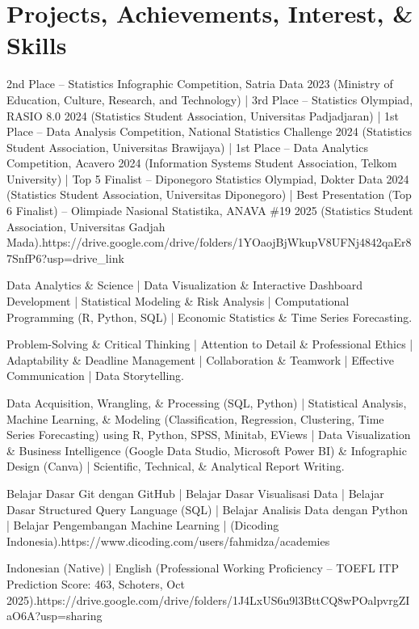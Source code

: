 \documentclass[a4paper,10pt]{article}
\begin{document}
\section{Projects, Achievements, Interest, \& Skills}


 {2nd Place – Statistics Infographic Competition, Satria Data 2023 (Ministry of Education, Culture, Research, and Technology) | 3rd Place – Statistics Olympiad, RASIO 8.0 2024 (Statistics Student Association, Universitas Padjadjaran) | 1st Place – Data Analysis Competition, National Statistics Challenge 2024 (Statistics Student Association, Universitas Brawijaya) | 1st Place – Data Analytics Competition, Acavero 2024 (Information Systems Student Association, Telkom University) | Top 5 Finalist – Diponegoro Statistics Olympiad, Dokter Data 2024 (Statistics Student Association, Universitas Diponegoro) | Best Presentation (Top 6 Finalist) – Olimpiade Nasional Statistika, ANAVA \#19 2025 (Statistics Student Association, Universitas Gadjah Mada).}{https://drive.google.com/drive/folders/1YOaojBjWkupV8UFNj4842qaEr87SnfP6?usp=drive_link}

 {Data Analytics \& Science | Data
  Visualization \& Interactive Dashboard Development | Statistical Modeling \& Risk Analysis | Computational Programming (R, Python, SQL) | Economic Statistics \& Time Series Forecasting.}

 {Problem-Solving \& Critical Thinking | Attention to Detail \& Professional Ethics | Adaptability \& Deadline Management | Collaboration \& Teamwork | Effective Communication | Data Storytelling.}

 {Data Acquisition, Wrangling, \& Processing (SQL, Python) | Statistical Analysis, Machine Learning, \& Modeling (Classification, Regression, Clustering, Time Series Forecasting) using R, Python, SPSS, Minitab, EViews | Data Visualization \& Business Intelligence (Google Data Studio, Microsoft Power BI) \& Infographic Design (Canva) | Scientific, Technical, \& Analytical Report Writing.}

 {Belajar Dasar Git dengan GitHub | Belajar Dasar Visualisasi Data | Belajar Dasar Structured Query Language (SQL) | Belajar Analisis Data dengan Python | Belajar Pengembangan Machine Learning | (Dicoding Indonesia).}{https://www.dicoding.com/users/fahmidza/academies}

 {Indonesian (Native) | English (Professional Working Proficiency – TOEFL ITP Prediction Score: 463, Schoters, Oct 2025).}{https://drive.google.com/drive/folders/1J4LxUS6u9l3BttCQ8wPOalpvrgZIaO6A?usp=sharing}
\end{document}
